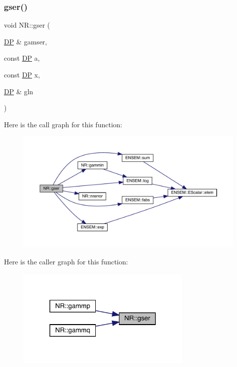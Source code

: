 \mbox{\label{namespaceNR_acf96c684ec4dc14593c22c45848ad511}} 
\subsubsection{\texorpdfstring{gser()}{gser()}}
{\footnotesize\ttfamily void N\+R\+::gser (\begin{DoxyParamCaption}\item[{\mbox{\hyperlink{namespaceNR_af6ff762dd605ff477b8e52387253a02a}{DP}} \&}]{gamser,  }\item[{const \mbox{\hyperlink{namespaceNR_af6ff762dd605ff477b8e52387253a02a}{DP}}}]{a,  }\item[{const \mbox{\hyperlink{namespaceNR_af6ff762dd605ff477b8e52387253a02a}{DP}}}]{x,  }\item[{\mbox{\hyperlink{namespaceNR_af6ff762dd605ff477b8e52387253a02a}{DP}} \&}]{gln }\end{DoxyParamCaption})}

Here is the call graph for this function\+:
\nopagebreak
\begin{figure}[H]
\begin{center}
\leavevmode
\includegraphics[width=350pt]{da/d46/namespaceNR_acf96c684ec4dc14593c22c45848ad511_cgraph}
\end{center}
\end{figure}
Here is the caller graph for this function\+:
\nopagebreak
\begin{figure}[H]
\begin{center}
\leavevmode
\includegraphics[width=241pt]{da/d46/namespaceNR_acf96c684ec4dc14593c22c45848ad511_icgraph}
\end{center}
\end{figure}
\mbox{\label{namespaceNR_a5eaa00a5151ec180e13b5fd8824fd161}} 
